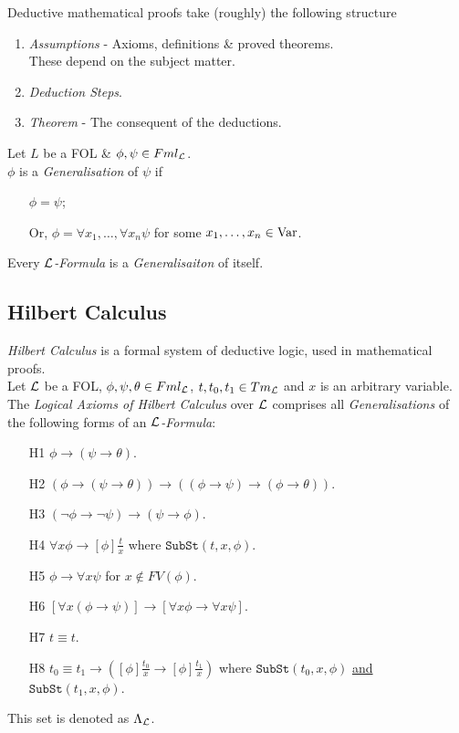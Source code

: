 \documentclass[11pt,a4paper]{article}
\begin{document}
Deductive mathematical proofs take (roughly) the following structure
\begin{enumerate}
	\item \textit{Assumptions} - Axioms, definitions \& proved theorems.\\
	\nb These depend on the subject matter.
	\item \textit{Deduction Steps}.
	\item \textit{Theorem} - The consequent of the deductions.
\end{enumerate}


Let $L$ be a FOL \& $\phi,\psi\in Fml_{\mathcal{L}}$.\\
$\phi$ is a \textit{Generalisation} of $\psi$ if
\begin{itemize}
	\item[] $\phi=\psi$;
	\item[Or,] $\phi=\forall x_1,\dots,\forall x_n\psi$ for some $x_1,\dots,x_n\in\mathrm{Var}$.
\end{itemize}
\nb Every \textit{$\mathcal{L}$-Formula} is a \textit{Generalisaiton} of itself.\\

\subsection{Hilbert Calculus}

\textit{Hilbert Calculus} is a formal system of deductive logic, used in mathematical proofs.\\

Let $\mathcal{L}$ be a FOL, $\phi,\psi,\theta\in Fml_{\mathcal{L}}$, $t,t_0,t_1\in Tm_{\mathcal{L}}$ and $x$ is an arbitrary variable.\\
The \textit{Logical Axioms of Hilbert Calculus} over $\mathcal{L}$ comprises all \textit{Generalisations} of the following forms of an \textit{$\mathcal{L}$-Formula}:
\begin{itemize}
	\item[H1] $\phi\to(\psi\to\theta)$.
	\item[H2] $(\phi\to(\psi\to\theta))\to((\phi\to\psi)\to(\phi\to\theta))$.
	\item[H3] $(\neg\phi\to\neg\psi)\to(\psi\to\phi)$.
	\item[H4] $\forall x\phi\to[\phi]\frac{t}x$ where $\mathtt{SubSt}(t,x,\phi)$.
	\item[H5] $\phi\to\forall x\psi$ for $x\not\in FV(\phi)$.
	\item[H6] $[\forall x(\phi\to\psi)]\to[\forall x\phi\to\forall x\psi]$.
	\item[H7] $t\equiv t$.
	\item[H8] $t_0\equiv t_1\to\left([\phi]\frac{t_0}x\to[\phi]\frac{t_1}x\right)$ where $\mathtt{SubSt}(t_0,x,\phi)$ \underline{and} $\mathtt{SubSt}(t_1,x,\phi)$.
\end{itemize}
\nb This set is denoted as $\Lambda_{\mathcal{L}}$.\\
\end{document}
